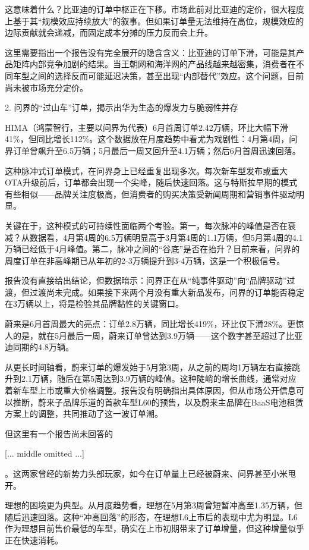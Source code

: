 \documentclass[11pt]{ctexart}
\begin{document}
这意味着什么？比亚迪的订单中枢正在下移。市场此前对比亚迪的定价，很大程度上基于其“规模效应持续放大”的叙事。但如果订单量无法维持在高位，规模效应的边际贡献就会递减，而固定成本分摊的压力反而会上升。

这里需要指出一个报告没有完全展开的隐含含义：比亚迪的订单下滑，可能是其产品矩阵内部竞争加剧的结果。当王朝网和海洋网的产品线越来越密集，消费者在不同车型之间的选择反而可能延迟决策，甚至出现“内部替代”效应。这个问题，目前尚未被市场充分定价。

2. 问界的“过山车”订单，揭示出华为生态的爆发力与脆弱性并存

HIMA（鸿蒙智行，主要以问界为代表）6月首周订单2.42万辆，环比大幅下滑41\%，但同比增长112\%。这个数据放在月度趋势中看尤为戏剧性：4月第4周，问界订单曾飙升至6.5万辆；5月最后一周又回升至4.1万辆；然后6月首周迅速回落。

这种脉冲式订单模式，在问界身上已经重复出现多次。每次新车型发布或重大OTA升级前后，订单都会出现一个尖峰，随后快速回落。这与特斯拉早期的模式有些相似——品牌关注度极高，但消费者的购买决策受新闻周期和营销事件驱动明显。

关键在于，这种模式的可持续性面临两个考验。第一，每次脉冲的峰值是否在衰减？从数据看，4月第4周的6.5万辆明显高于3月第4周的1.1万辆，但5月第4周的4.1万辆已经低于4月峰值。第二，脉冲之间的“谷底”是否在抬升？目前来看，问界的周度订单在非高峰期已从年初的2-3万辆提升到3-4万辆，这是一个积极信号。

报告没有直接给出结论，但数据暗示：问界正在从“纯事件驱动”向“品牌驱动”过渡，但过渡尚未完成。如果接下来两个月没有重大新品发布，问界的订单能否稳定在3万辆以上，将是检验其品牌黏性的关键窗口。

蔚来是6月首周最大的亮点：订单2.8万辆，同比增长419\%，环比仅下滑28\%。更惊人的是，就在5月最后一周，蔚来订单曾达到3.9万辆——这个数字甚至超过了比亚迪同期的4.8万辆。

从更长时间轴看，蔚来订单的爆发始于5月第3周，从之前的周均1万辆左右直接跳升到2.1万辆，随后在第5周达到3.9万辆的峰值。这种陡峭的增长曲线，通常对应着新车型上市或重大价格调整。报告没有明确指出具体原因，但从市场公开信息可以推断，蔚来子品牌乐道的首款车型L60的预售，以及蔚来主品牌在BaaS电池租赁方案上的调整，共同推动了这一波订单潮。

但这里有一个报告尚未回答的

[... middle omitted ...]

。这两家曾经的新势力头部玩家，如今在订单量上已经被蔚来、问界甚至小米甩开。

理想的困境更为典型。从月度趋势看，理想在5月第3周曾短暂冲高至1.35万辆，但随后迅速回落。这种“冲高回落”的形态，在理想L6上市后的表现中尤为明显。L6作为理想目前售价最低的车型，确实在上市初期带来了订单增量，但这种增量似乎正在快速消耗。
\end{document}
